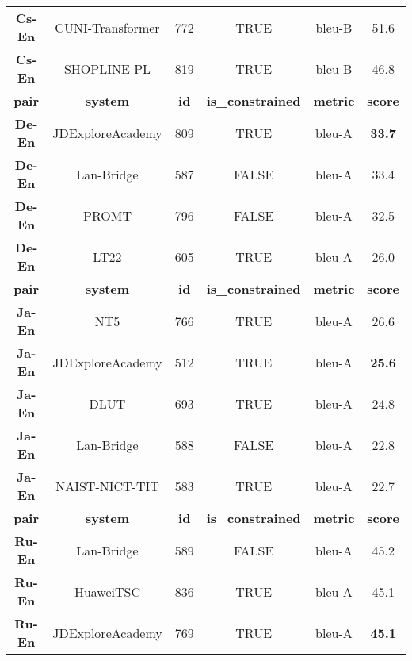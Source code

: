 \documentclass[11pt,a4paper]{article}
\begin{document}
\begin{table*}[t]
{\begin{tabular}{cccccc}
    \textbf{Cs-En} & CUNI-Transformer    & 772         & TRUE                    & bleu-B          & 51.6           \\
    \textbf{Cs-En} & SHOPLINE-PL         & 819         & TRUE                    & bleu-B          & 46.8           \\ \hline
    \textbf{pair}  & \textbf{system}     & \textbf{id} & \textbf{is\_constrained} & \textbf{metric} & \textbf{score} \\ \hline
    \textbf{De-En} & JDExploreAcademy    & 809         & TRUE                    & bleu-A          & \textbf{33.7}  \\
    \textbf{De-En} & Lan-Bridge          & 587         & FALSE                   & bleu-A          & 33.4           \\
    \textbf{De-En} & PROMT               & 796         & FALSE                   & bleu-A          & 32.5           \\
    \textbf{De-En} & LT22                & 605         & TRUE                    & bleu-A          & 26.0           \\ \hline
    \textbf{pair}  & \textbf{system}     & \textbf{id} & \textbf{is\_constrained} & \textbf{metric} & \textbf{score} \\ \hline
    \textbf{Ja-En} & NT5                 & 766         & TRUE                    & bleu-A          & 26.6           \\
    \textbf{Ja-En} & JDExploreAcademy    & 512         & TRUE                    & bleu-A          & \textbf{25.6}  \\
    \textbf{Ja-En} & DLUT                & 693         & TRUE                    & bleu-A          & 24.8           \\
    \textbf{Ja-En} & Lan-Bridge          & 588         & FALSE                   & bleu-A          & 22.8           \\
    \textbf{Ja-En} & NAIST-NICT-TIT      & 583         & TRUE                    & bleu-A          & 22.7           \\ \hline
    \textbf{pair}  & \textbf{system}     & \textbf{id} & \textbf{is\_constrained} & \textbf{metric} & \textbf{score} \\ \hline
    \textbf{Ru-En} & Lan-Bridge          & 589         & FALSE                   & bleu-A          & 45.2           \\
    \textbf{Ru-En} & HuaweiTSC           & 836         & TRUE                    & bleu-A          & 45.1           \\
    \textbf{Ru-En} & JDExploreAcademy    & 769         & TRUE                    & bleu-A          & \textbf{45.1}  \\

\end{tabular}}
\end{table*}
\end{document}
